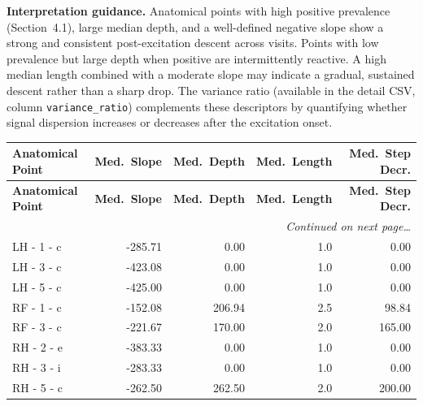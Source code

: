\documentclass[a4paper,11pt]{article}
\begin{document}
\medskip
\noindent\textbf{Interpretation guidance.}
Anatomical points with high positive prevalence (Section~4.1), large median depth, and a
well-defined negative slope show a strong and consistent post-excitation descent across
visits.
Points with low prevalence but large depth when positive are intermittently reactive.
A high median length combined with a moderate slope may indicate a gradual, sustained
descent rather than a sharp drop.
The variance ratio (available in the detail CSV, column \texttt{variance\_ratio}) complements
these descriptors by quantifying whether signal dispersion increases or decreases after the
excitation onset.

\begin{small}
\begin{longtable}{p{4.5cm}rrrr}
\toprule
\textbf{Anatomical Point} &
\textbf{Med.\ Slope} &
\textbf{Med.\ Depth} &
\textbf{Med.\ Length} &
\textbf{Med.\ Step Decr.} \\
\midrule
\endfirsthead
\toprule
\textbf{Anatomical Point} &
\textbf{Med.\ Slope} &
\textbf{Med.\ Depth} &
\textbf{Med.\ Length} &
\textbf{Med.\ Step Decr.} \\
\midrule
\endhead
\midrule
\multicolumn{5}{r}{\small\emph{Continued on next page\ldots}} \\
\endfoot
\bottomrule
\endlastfoot
LH - 1 - c & -285.71 & 0.00 & 1.0 & 0.00 \\
LH - 3 - c & -423.08 & 0.00 & 1.0 & 0.00 \\
LH - 5 - c & -425.00 & 0.00 & 1.0 & 0.00 \\
RF - 1 - c & -152.08 & 206.94 & 2.5 & 98.84 \\
RF - 3 - c & -221.67 & 170.00 & 2.0 & 165.00 \\
RH - 2 - e & -383.33 & 0.00 & 1.0 & 0.00 \\
RH - 3 - i & -283.33 & 0.00 & 1.0 & 0.00 \\
RH - 5 - c & -262.50 & 262.50 & 2.0 & 200.00 \\
\end{longtable}
\end{small}
\end{document}
